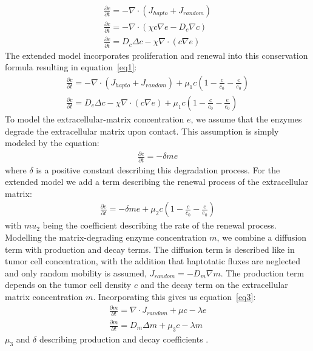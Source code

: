 \begin{align*}
    \frac{\partial c}{\partial t} = -\nabla \cdot (J_{hapto} + J_{random}) \\
    \frac{\partial c}{\partial t} = -\nabla \cdot (\chi c \nabla e -D_c \nabla c ) \\
    \frac{\partial c}{\partial t} = D_c \Delta c - \chi \nabla \cdot (c\nabla e)
\end{align*}
The extended model incorporates proliferation and renewal into this conservation formula resulting in equation~\ref{eq1}:
\begin{align*}
    \frac{\partial c}{\partial t} = -\nabla \cdot (J_{hapto} + J_{random}) + \mu_1 c (1-\frac{c}{c_0} - \frac{e}{e_0}) \\
    \frac{\partial c}{\partial t} = D_c \Delta c - \chi \nabla \cdot (c\nabla e) + \mu_1 c (1-\frac{c}{c_0} - \frac{e}{e_0})
\end{align*}
To model the extracellular-matrix concentration $e$, we assume that the enzymes degrade the extracellular matrix upon contact. This assumption is simply modeled by the equation:
\begin{align*}
    \frac{\partial e}{\partial t} = -\delta m e
\end{align*}
where $\delta$ is a positive constant describing this degradation process. For the extended model we add a term describing the renewal process of the extracellular matrix: 
\begin{align*}
    \frac{\partial e}{\partial t} = -\delta m e + \mu_2 c (1 - \frac{c}{c_0} - \frac{e}{e_0})
\end{align*}
with $mu_2$ being the coefficient describing the rate of the renewal process.\newline
Modelling the matrix-degrading enzyme concentration $m$, we combine a diffusion term with production and decay terms. The diffusion term is described like in tumor cell concentration, with the addition that haptotatic fluxes are neglected and only random mobility is assumed, $J_{random} = -D_m \nabla m$. The production term depends on the tumor cell density $c$ and the decay term on the extracellular matrix concentration $m$. Incorporating this gives us equation~\ref{eq3}:
\begin{align*}
    \frac{\partial m}{\partial t} = \nabla \cdot J_{random} + \mu c - \lambda e \\
    \frac{\partial m}{\partial t} = D_m \Delta m + \mu_3 c - \lambda m
\end{align*}
$\mu_3$ and $\delta$ describing production and decay coefficients .


